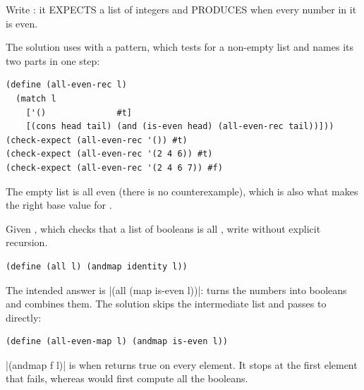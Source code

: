 \begin{exercise}
Write : it EXPECTS a list of integers and PRODUCES  when every number in it is even.
\end{exercise}
\begin{solution}
The solution uses  with a  pattern, which tests for a non-empty list and names its two parts in one step:
\begin{lstlisting}
(define (all-even-rec l)
  (match l
    ['()              #t]
    [(cons head tail) (and (is-even head) (all-even-rec tail))]))
(check-expect (all-even-rec '()) #t)
(check-expect (all-even-rec '(2 4 6)) #t)
(check-expect (all-even-rec '(2 4 6 7)) #f)
\end{lstlisting}
The empty list is all even (there is no counterexample), which is also what makes  the right base value for .
\end{solution}

\begin{exercise}[Map]
Given , which checks that a list of booleans is all , write  without explicit recursion.
\begin{lstlisting}
(define (all l) (andmap identity l))
\end{lstlisting}
\end{exercise}
\begin{solution}
The intended answer is \rkt|(all (map is-even l))|:  turns the numbers into booleans and  combines them. The solution skips the intermediate list and passes  to  directly:
\begin{lstlisting}
(define (all-even-map l) (andmap is-even l))
\end{lstlisting}
\rkt|(andmap f l)| is  when  returns true on every element. It stops at the first element that fails, whereas  would first compute all the booleans.
\end{solution}

